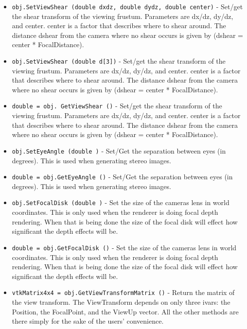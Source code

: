 \begin{itemize}
\item  \verb|obj.SetViewShear (double dxdz, double dydz, double center)| -  Set/get the shear transform of the viewing frustum.  Parameters are
 dx/dz, dy/dz, and center.  center is a factor that describes where
 to shear around. The distance dshear from the camera where
 no shear occurs is given by (dshear = center * FocalDistance).

\item  \verb|obj.SetViewShear (double d[3])| -  Set/get the shear transform of the viewing frustum.  Parameters are
 dx/dz, dy/dz, and center.  center is a factor that describes where
 to shear around. The distance dshear from the camera where
 no shear occurs is given by (dshear = center * FocalDistance).

\item  \verb|double = obj. GetViewShear ()| -  Set/get the shear transform of the viewing frustum.  Parameters are
 dx/dz, dy/dz, and center.  center is a factor that describes where
 to shear around. The distance dshear from the camera where
 no shear occurs is given by (dshear = center * FocalDistance).

\item  \verb|obj.SetEyeAngle (double )| -  Set/Get the separation between eyes (in degrees). This is used
 when generating stereo images.

\item  \verb|double = obj.GetEyeAngle ()| -  Set/Get the separation between eyes (in degrees). This is used
 when generating stereo images.

\item  \verb|obj.SetFocalDisk (double )| -  Set the size of the cameras lens in world coordinates. This is only
 used when the renderer is doing focal depth rendering. When that is
 being done the size of the focal disk will effect how significant the
 depth effects will be.

\item  \verb|double = obj.GetFocalDisk ()| -  Set the size of the cameras lens in world coordinates. This is only
 used when the renderer is doing focal depth rendering. When that is
 being done the size of the focal disk will effect how significant the
 depth effects will be.

\item  \verb|vtkMatrix4x4 = obj.GetViewTransformMatrix ()| -  Return the matrix of the view transform.
 The ViewTransform depends on only three ivars:  the Position, the
 FocalPoint, and the ViewUp vector.  All the other methods are there
 simply for the sake of the users' convenience.


\end{itemize}
